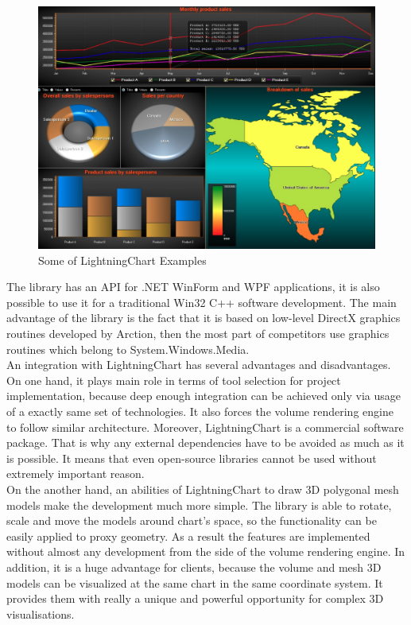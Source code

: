 \documentclass[twoside, english, 11pt]{report}
\begin{document}
\begin{figure}[!h]
\centerline{\includegraphics[scale=0.4]{img/chart}}
\caption{Some of LightningChart Examples}
\end{figure}

The library has an API for .NET WinForm and WPF applications, it is also possible to use it for a traditional Win32 C++ software development. The main advantage of the library is the fact that it is based on low-level DirectX graphics routines developed by Arction, then the most part of competitors use graphics routines which belong to System.Windows.Media.\\

An integration with LightningChart has several advantages and disadvantages. On one hand, it plays main role in terms of tool selection for project implementation, because deep enough integration can be achieved only via usage of a exactly same set of technologies. It also forces the volume rendering engine to follow similar architecture. Moreover, LightningChart is a commercial software package. That is why any external dependencies have to be avoided as much as it is possible. It means that even open-source libraries cannot be used without extremely important reason.\\

On the another hand, an abilities of LightningChart to draw 3D polygonal mesh models make the development much more simple. The library is able to rotate, scale and move the models around chart's space, so the functionality can be easily applied to proxy geometry. As a result the features are implemented without almost any development from the side of the volume rendering engine. In addition, it is a huge advantage for clients, because the volume and mesh 3D models can be visualized at the same chart in the same coordinate system. It provides them with really a unique and powerful opportunity for complex 3D visualisations.
\end{document}
